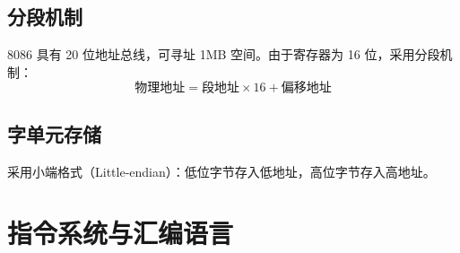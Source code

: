 \documentclass[12pt,a4paper]{ctexart}
\begin{document}
\subsection{分段机制}
8086 具有 20 位地址总线，可寻址 1MB 空间。由于寄存器为 16 位，采用分段机制：
\begin{equation}
    \text{物理地址} = \text{段地址} \times 16 + \text{偏移地址}
\end{equation}

\subsection{字单元存储}
采用小端格式（Little-endian）：低位字节存入低地址，高位字节存入高地址。

\section{指令系统与汇编语言}
\end{document}
